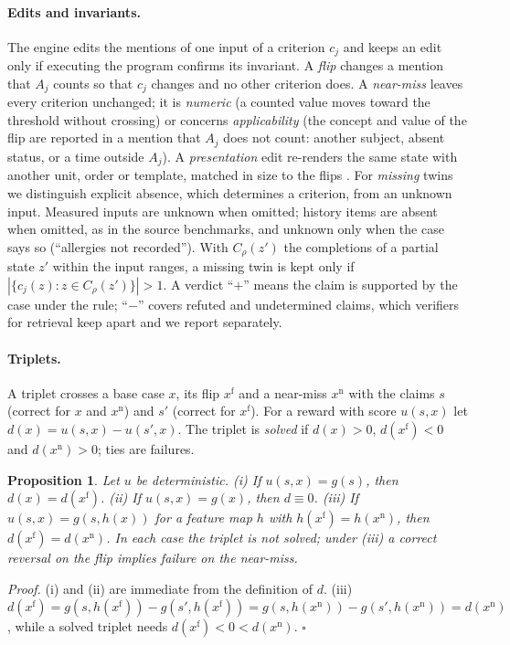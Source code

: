 \documentclass[11pt]{article}
\newcommand{\xf}{x^{\mathrm{f}}}
\newcommand{\xn}{x^{\mathrm{n}}}
\newtheorem{proposition}{Proposition}
\begin{document}
\paragraph{Edits and invariants.}
The engine edits the mentions of one input of a criterion $c_j$ and keeps an
edit only if executing the program confirms its invariant. A \emph{flip}
changes a mention that $A_j$ counts so that $c_j$ changes and no other
criterion does. A \emph{near-miss} leaves every criterion unchanged; it is
\emph{numeric} (a counted value moves toward the threshold without crossing)
or concerns \emph{applicability} (the concept and value of the flip are
reported in a mention that $A_j$ does not count: another subject, absent
status, or a time outside $A_j$). A \emph{presentation} edit re-renders the
same state with another unit, order or template, matched in size to the flips
\citep{yang2026compared}. For \emph{missing} twins we distinguish explicit
absence, which determines a criterion, from an unknown input. Measured inputs
are unknown when omitted; history items are absent when omitted, as in the
source benchmarks, and unknown only when the case says so (``allergies not
recorded''). With $C_\rho(z')$ the completions of a partial state $z'$ within
the input ranges, a missing twin is kept only if
$|\{c_j(z): z\in C_\rho(z')\}|>1$. A verdict ``$+$'' means the claim is
supported by the case under the rule; ``$-$'' covers refuted and undetermined
claims, which verifiers for retrieval keep apart
\citep{qiu2026surerag,kamelhar2026gsar} and we report separately.

\paragraph{Triplets.}
A triplet crosses a base case $x$, its flip $\xf$ and a near-miss $\xn$ with
the claims $s$ (correct for $x$ and $\xn$) and $s'$ (correct for $\xf$). For a
reward with score $u(s,x)$ let $d(x)=u(s,x)-u(s',x)$. The triplet is
\emph{solved} if $d(x)>0$, $d(\xf)<0$ and $d(\xn)>0$; ties are failures.

\begin{proposition}
\label{prop:blind}
Let $u$ be deterministic. (i) If $u(s,x)=g(s)$, then $d(x)=d(\xf)$. (ii) If
$u(s,x)=g(x)$, then $d\equiv 0$. (iii) If $u(s,x)=g(s,h(x))$ for a feature map
$h$ with $h(\xf)=h(\xn)$, then $d(\xf)=d(\xn)$. In each case the triplet is
not solved; under (iii) a correct reversal on the flip implies failure on the
near-miss.
\end{proposition}
\noindent\emph{Proof.} (i) and (ii) are immediate from the definition of $d$.
(iii) $d(\xf)=g(s,h(\xf))-g(s',h(\xf))=g(s,h(\xn))-g(s',h(\xn))=d(\xn)$, while
a solved triplet needs $d(\xf)<0<d(\xn)$. \hfill$\square$
\end{document}
